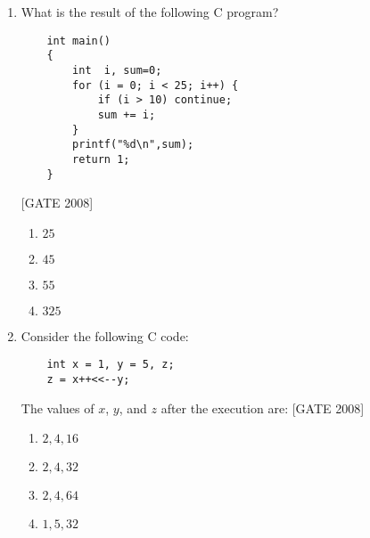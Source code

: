 \documentclass[journal,12pt,onecolumn]{IEEEtran}
\theoremstyle{remark}
\begin{document}
\begin{enumerate}
\begin{verbatim}
    SUBROUTINE SIEDEL(A, C, X, N, IMAX)
    REAL :: SUM
    REAL, DIMENSION(N,N) :: A
    REAL, DIMENSION(N) :: C, X
    DO K = 1, IMAX
        DO I = 1, N
            SUM = 0.0
            DO J = 1, N
                IF (I /= J) THEN
                    SUM = SUM + A(I,J)*X(J)
                ENDIF
            ENDDO
            ******
        ENDDO
    ENDDO
    END SUBROUTINE SIEDEL
\end{verbatim}

The missing statement in the program, indicated by `******`, is:\hfill{[GATE 2008]}

\begin{multicols}{4}
\begin{enumerate}
    \item $ X(I) = C(I) + SUM $
    \item $ X(I) = C(I) + SUM $
    \item $ X(I) = \frac{C(I) + SUM}{A(I,I)} $
    \item $ X(I) = \frac{C(I) - SUM}{A(I,I)} $
\end{enumerate}
\end{multicols}

\item What is the result of the following C program?

\begin{verbatim}
    int main()
    {
        int  i, sum=0;
        for (i = 0; i < 25; i++) {
            if (i > 10) continue;
            sum += i;
        }
        printf("%d\n",sum);
        return 1;
    }
\end{verbatim}
\hfill{[GATE 2008]}

\begin{multicols}{4}
\begin{enumerate}
    \item $ 25 $
    \item $ 45 $
    \item $ 55 $
    \item $ 325 $
\end{enumerate}
\end{multicols}

\item Consider the following C code:

\begin{verbatim}
    int x = 1, y = 5, z;
    z = x++<<--y;
\end{verbatim}

The values of $ x $, $ y$, and $ z$ after the execution are:
\hfill{[GATE 2008]}
\begin{multicols}{4}
\begin{enumerate}
    \item $ 2, 4, 16 $
    \item $ 2, 4, 32 $
    \item $ 2, 4, 64 $
    \item $ 1, 5, 32 $
\end{enumerate}
\end{multicols}


\end{enumerate}
\end{document}
